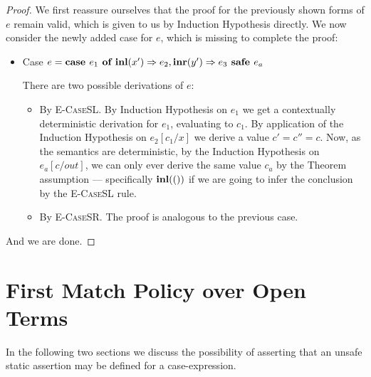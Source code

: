 \begin{theorem}[Continued]\label{thm:ctxbackwarddet}

\end{theorem}

\begin{proof}

  We first reassure ourselves that the proof for the previously shown forms of
  $e$ remain valid, which is given to us by Induction Hypothesis directly. We
  now consider the newly added case for $e$, which is missing to complete the
  proof:

  \begin{itemize}

    \item Case $e = \textbf{case } e_1 \textbf{ of } \textbf{inl}(x') \Rightarrow e_2, \textbf{inr}(y') \Rightarrow e_3 \textbf{ safe } e_a$

      There are two possible derivations of $e$:

  \begin{itemize}

      \item By \textsc{E-CaseSL}. By Induction Hypothesis on $e_1$ we get a
        contextually deterministic derivation for $e_1$, evaluating to $c_1$.
        By application of the Induction Hypothesis on $e_2 [c_1 / x]$ we derive
        a value $c' = c'' = c$. Now, as the semantics are deterministic, by the
        Induction Hypothesis on $e_a [c / out]$, we can only ever derive the
        same value $c_a$ by the Theorem assumption --- specifically $\textbf{inl}(())$
        if we are going to infer the conclusion by the \textsc{E-CaseSL} rule.

      \item By \textsc{E-CaseSR}. The proof is analogous to the previous case.

    \end{itemize}

  \end{itemize}

  And we are done.

\end{proof}

\section{First Match Policy over Open Terms}\label{subsec:fmp_guarantee}

In the following two sections we discuss the possibility of asserting that an
unsafe static assertion may be defined for a case-expression.

